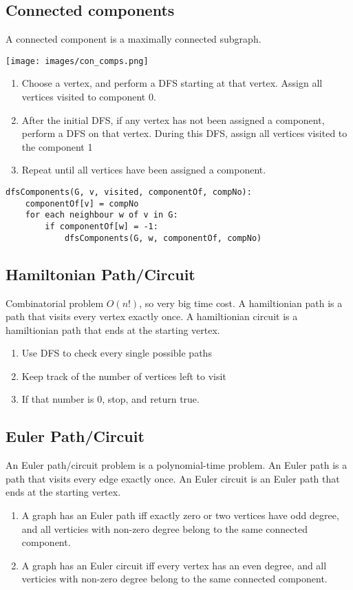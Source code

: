 \documentclass[14]{article}
\begin{document}
\subsection{Connected components}
A connected component is a maximally connected subgraph.
\begin{center}
    \texttt{[image: images/con\_comps.png]}
\end{center}
\begin{enumerate}
    \item Choose a vertex, and perform a DFS starting at that vertex. Assign all vertices
        visited to component 0. 
    \item After the initial DFS, if any vertex has not been assigned a component,
        perform a DFS on that vertex. During this DFS, assign all vertices visited to
        the component 1
    \item Repeat until all vertices have been assigned a component.
\end{enumerate}
\begin{verbatim}
dfsComponents(G, v, visited, componentOf, compNo):
    componentOf[v] = compNo
    for each neighbour w of v in G:
        if componentOf[w] = -1:
            dfsComponents(G, w, componentOf, compNo)
\end{verbatim}
\subsection{Hamiltonian Path/Circuit}
Combinatorial problem $O(n!)$, so very big time cost. A hamiltionian path is a path that visits every vertex exactly once.
A hamiltionian circuit is a hamiltionian path that ends at the starting vertex.
\begin{enumerate}
    \item Use DFS to check every single possible paths
    \item Keep track of the number of vertices left to visit
    \item If that number is 0, stop, and return true.
\end{enumerate}
\subsection{Euler Path/Circuit}
An Euler path/circuit problem is a polynomial-time problem. An Euler path is a path that visits every edge exactly once.
An Euler circuit is an Euler path that ends at the starting vertex.
\begin{enumerate}
    \item A graph has an Euler path iff exactly zero or two vertices have odd degree, and all verticies with non-zero degree
        belong to the same connected component.
    \item A graph has an Euler circuit iff every vertex has an even degree, and all verticies with non-zero degree belong 
        to the same connected component. 
\end{enumerate}
\end{document}

